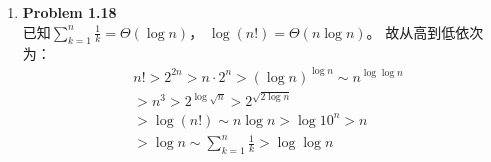 \documentclass[utf8]{ctexart}
\begin{document}
\begin{enumerate}[label=\arabic*.]
\begin{enumerate}[label= (\arabic*)]
\[\begin{aligned}
        &=\lim_{n\to\infty}\frac{1+\frac{1}{\sqrt{n}}}{2n}\\
        &=0
        \end{aligned}\]
        因此，有$f(n)=O(g(n))$。
        \item[(4)]由定义，考虑\[ \begin{aligned}
        \lim_{n\to\infty}\frac{f(n)}{g(n)}&=\lim_{n\to\infty}\frac{2\log^2n}{\log{n}+1}\\
        &=\lim_{n\to\infty}\frac{4\log{n}\cdot\frac{1}{n}}{\frac{1}{n}}\\
        &=\lim_{n\to\infty}4\log{n}\\
        &=+\infty
        \end{aligned}\]
        因此，有$g(n)=O(f(n))$。
    \end{enumerate}
    \item \textbf{Problem 1.18}\\
        已知$\displaystyle\sum_{k=1}^{n}\frac{1}{k}=\Theta(\log{n})$，
        $\log(n!)=\Theta(n\log n)$。
        故从高到低依次为：\[
        \begin{aligned}
            &n!>2^{2n}>n\cdot2^n>(\log{n})^{\log{n}}\sim n^{\log{\log{n}}}\\
            &>n^3>2^{\log\sqrt{n}}>2^{\sqrt{2\log{n}}}\\
            &>\log(n!)\sim n\log{n}>\log{10^n}>n\\
            &>\log n\sim\sum_{k=1}^{n}\frac{1}{k}>\log{\log n} 
        \end{aligned}\]


\end{enumerate}
\end{document}
